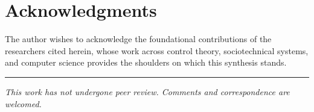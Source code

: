 \documentclass[12pt]{article}
\begin{document}
\section*{Acknowledgments}

The author wishes to acknowledge the foundational contributions of the researchers cited herein, whose work across control theory, sociotechnical systems, and computer science provides the shoulders on which this synthesis stands.




\vspace{2em}
\hrule
\vspace{0.5em}
\noindent\small\textit{This work has not undergone peer review. Comments and correspondence are welcomed.}
\end{document}
